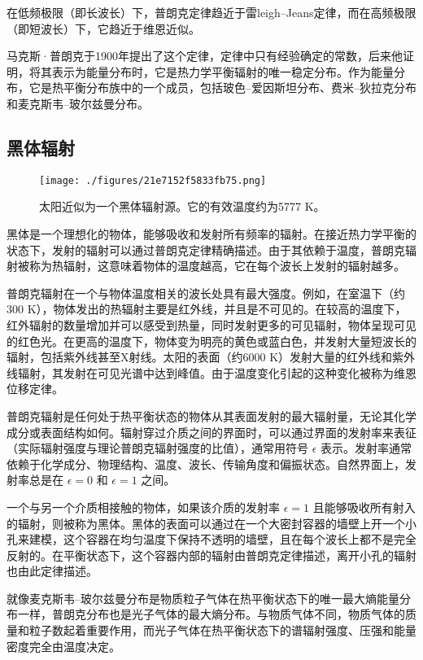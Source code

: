 在低频极限（即长波长）下，普朗克定律趋近于雷leigh–Jeans定律，而在高频极限（即短波长）下，它趋近于维恩近似。

马克斯·普朗克于1900年提出了这个定律，定律中只有经验确定的常数，后来他证明，将其表示为能量分布时，它是热力学平衡辐射的唯一稳定分布。作为能量分布，它是热平衡分布族中的一个成员，包括玻色–爱因斯坦分布、费米–狄拉克分布和麦克斯韦–玻尔兹曼分布。
\subsection{黑体辐射}
\begin{figure}[ht]
\centering
\texttt{[image: ./figures/21e7152f5833fb75.png]}
\caption{太阳近似为一个黑体辐射源。它的有效温度约为5777 K。} \label{fig_HTFS_2}
\end{figure}
黑体是一个理想化的物体，能够吸收和发射所有频率的辐射。在接近热力学平衡的状态下，发射的辐射可以通过普朗克定律精确描述。由于其依赖于温度，普朗克辐射被称为热辐射，这意味着物体的温度越高，它在每个波长上发射的辐射越多。

普朗克辐射在一个与物体温度相关的波长处具有最大强度。例如，在室温下（约300 K），物体发出的热辐射主要是红外线，并且是不可见的。在较高的温度下，红外辐射的数量增加并可以感受到热量，同时发射更多的可见辐射，物体呈现可见的红色光。在更高的温度下，物体变为明亮的黄色或蓝白色，并发射大量短波长的辐射，包括紫外线甚至X射线。太阳的表面（约6000 K）发射大量的红外线和紫外线辐射，其发射在可见光谱中达到峰值。由于温度变化引起的这种变化被称为维恩位移定律。

普朗克辐射是任何处于热平衡状态的物体从其表面发射的最大辐射量，无论其化学成分或表面结构如何。辐射穿过介质之间的界面时，可以通过界面的发射率来表征（实际辐射强度与理论普朗克辐射强度的比值），通常用符号 \( \epsilon \) 表示。发射率通常依赖于化学成分、物理结构、温度、波长、传输角度和偏振状态。自然界面上，发射率总是在 \( \epsilon = 0 \) 和 \( \epsilon = 1 \) 之间。

一个与另一个介质相接触的物体，如果该介质的发射率 \( \epsilon = 1 \) 且能够吸收所有射入的辐射，则被称为黑体。黑体的表面可以通过在一个大密封容器的墙壁上开一个小孔来建模，这个容器在均匀温度下保持不透明的墙壁，且在每个波长上都不是完全反射的。在平衡状态下，这个容器内部的辐射由普朗克定律描述，离开小孔的辐射也由此定律描述。

就像麦克斯韦–玻尔兹曼分布是物质粒子气体在热平衡状态下的唯一最大熵能量分布一样，普朗克分布也是光子气体的最大熵分布。与物质气体不同，物质气体的质量和粒子数起着重要作用，而光子气体在热平衡状态下的谱辐射强度、压强和能量密度完全由温度决定。

